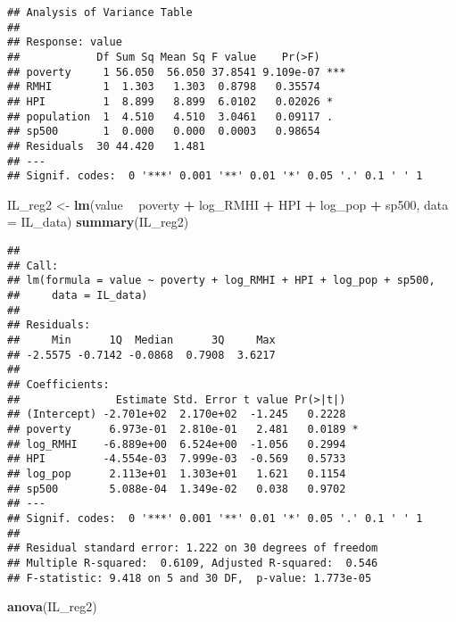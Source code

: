 \documentclass[
]{article}
\newenvironment{Shaded}{\begin{snugshade}}{\end{snugshade}}
\newcommand{\DataTypeTok}[1]{\textcolor[rgb]{0.13,0.29,0.53}{#1}}
\newcommand{\KeywordTok}[1]{\textcolor[rgb]{0.13,0.29,0.53}{\textbf{#1}}}
\newcommand{\NormalTok}[1]{#1}
\newcommand{\OperatorTok}[1]{\textcolor[rgb]{0.81,0.36,0.00}{\textbf{#1}}}
\newcommand{\StringTok}[1]{\textcolor[rgb]{0.31,0.60,0.02}{#1}}
\begin{document}
\begin{verbatim}
## Analysis of Variance Table
## 
## Response: value
##            Df Sum Sq Mean Sq F value    Pr(>F)    
## poverty     1 56.050  56.050 37.8541 9.109e-07 ***
## RMHI        1  1.303   1.303  0.8798   0.35574    
## HPI         1  8.899   8.899  6.0102   0.02026 *  
## population  1  4.510   4.510  3.0461   0.09117 .  
## sp500       1  0.000   0.000  0.0003   0.98654    
## Residuals  30 44.420   1.481                      
## ---
## Signif. codes:  0 '***' 0.001 '**' 0.01 '*' 0.05 '.' 0.1 ' ' 1
\end{verbatim}

\begin{Shaded}
\begin{Highlighting}[]
\NormalTok{IL_reg2 <-}\StringTok{ }\KeywordTok{lm}\NormalTok{(value }\OperatorTok{~}\StringTok{ }\NormalTok{poverty }\OperatorTok{+}\StringTok{ }\NormalTok{log_RMHI }\OperatorTok{+}\StringTok{ }\NormalTok{HPI }\OperatorTok{+}\StringTok{ }\NormalTok{log_pop }\OperatorTok{+}\StringTok{ }\NormalTok{sp500, }\DataTypeTok{data =}\NormalTok{ IL_data)}
\KeywordTok{summary}\NormalTok{(IL_reg2)}
\end{Highlighting}
\end{Shaded}

\begin{verbatim}
## 
## Call:
## lm(formula = value ~ poverty + log_RMHI + HPI + log_pop + sp500, 
##     data = IL_data)
## 
## Residuals:
##     Min      1Q  Median      3Q     Max 
## -2.5575 -0.7142 -0.0868  0.7908  3.6217 
## 
## Coefficients:
##               Estimate Std. Error t value Pr(>|t|)  
## (Intercept) -2.701e+02  2.170e+02  -1.245   0.2228  
## poverty      6.973e-01  2.810e-01   2.481   0.0189 *
## log_RMHI    -6.889e+00  6.524e+00  -1.056   0.2994  
## HPI         -4.554e-03  7.999e-03  -0.569   0.5733  
## log_pop      2.113e+01  1.303e+01   1.621   0.1154  
## sp500        5.088e-04  1.349e-02   0.038   0.9702  
## ---
## Signif. codes:  0 '***' 0.001 '**' 0.01 '*' 0.05 '.' 0.1 ' ' 1
## 
## Residual standard error: 1.222 on 30 degrees of freedom
## Multiple R-squared:  0.6109, Adjusted R-squared:  0.546 
## F-statistic: 9.418 on 5 and 30 DF,  p-value: 1.773e-05
\end{verbatim}

\begin{Shaded}
\begin{Highlighting}[]
\KeywordTok{anova}\NormalTok{(IL_reg2)}
\end{Highlighting}
\end{Shaded}
\end{document}
